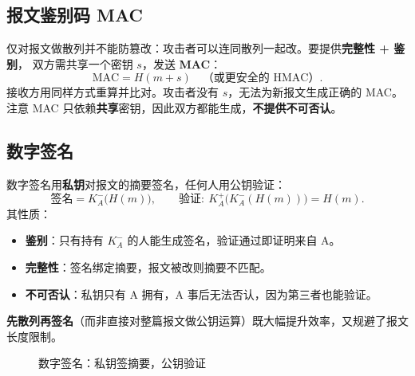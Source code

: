 \subsection{报文鉴别码 MAC}

仅对报文做散列并不能防篡改：攻击者可以连同散列一起改。要提供\textbf{完整性 + 鉴别}，
双方需共享一个密钥 $s$，发送 \textbf{MAC}：
\begin{equation}
    \text{MAC} = H(m+s) \quad\text{（或更安全的 HMAC）}.
    \label{eq:mac}
\end{equation}
接收方用同样方式重算并比对。攻击者没有 $s$，无法为新报文生成正确的 MAC。
注意 MAC 只依赖\textbf{共享}密钥，因此双方都能生成，\textbf{不提供不可否认}。

\subsection{数字签名}

数字签名用\textbf{私钥}对报文的摘要签名，任何人用公钥验证：
\begin{equation}
    \text{签名} = K_A^-\bigl(H(m)\bigr), \qquad
    \text{验证}:\ K_A^+\bigl(K_A^-(H(m))\bigr) = H(m).
    \label{eq:sign}
\end{equation}
其性质：
\begin{itemize}
    \item \textbf{鉴别}：只有持有 $K_A^-$ 的人能生成签名，验证通过即证明来自 A。
    \item \textbf{完整性}：签名绑定摘要，报文被改则摘要不匹配。
    \item \textbf{不可否认}：私钥只有 A 拥有，A 事后无法否认，因为第三者也能验证。
\end{itemize}
\textbf{先散列再签名}（而非直接对整篇报文做公钥运算）既大幅提升效率，又规避了报文
长度限制。

\begin{figure}[H]
\centering
{}
\caption{数字签名：私钥签摘要，公钥验证}
\label{fig:signature}
\end{figure}

